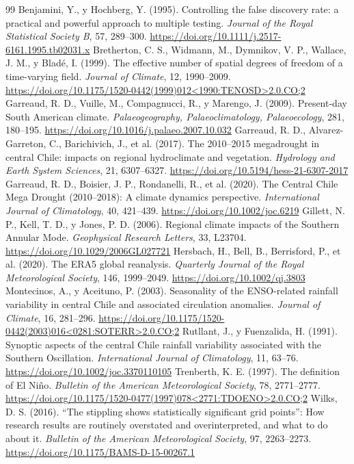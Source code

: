 \documentclass[11pt,letterpaper]{article}
\begin{document}
\begin{thebibliography}{99}\small
 Benjamini, Y., y Hochberg, Y. (1995). Controlling the false discovery rate: a practical and powerful approach to multiple testing. \emph{Journal of the Royal Statistical Society B}, 57, 289--300. \url{https://doi.org/10.1111/j.2517-6161.1995.tb02031.x}
 Bretherton, C. S., Widmann, M., Dymnikov, V. P., Wallace, J. M., y Bladé, I. (1999). The effective number of spatial degrees of freedom of a time-varying field. \emph{Journal of Climate}, 12, 1990--2009. \url{https://doi.org/10.1175/1520-0442(1999)012<1990:TENOSD>2.0.CO;2}
 Garreaud, R. D., Vuille, M., Compagnucci, R., y Marengo, J. (2009). Present-day South American climate. \emph{Palaeogeography, Palaeoclimatology, Palaeoecology}, 281, 180--195. \url{https://doi.org/10.1016/j.palaeo.2007.10.032}
 Garreaud, R. D., Alvarez-Garreton, C., Barichivich, J., et al. (2017). The 2010--2015 megadrought in central Chile: impacts on regional hydroclimate and vegetation. \emph{Hydrology and Earth System Sciences}, 21, 6307--6327. \url{https://doi.org/10.5194/hess-21-6307-2017}
 Garreaud, R. D., Boisier, J. P., Rondanelli, R., et al. (2020). The Central Chile Mega Drought (2010--2018): A climate dynamics perspective. \emph{International Journal of Climatology}, 40, 421--439. \url{https://doi.org/10.1002/joc.6219}
 Gillett, N. P., Kell, T. D., y Jones, P. D. (2006). Regional climate impacts of the Southern Annular Mode. \emph{Geophysical Research Letters}, 33, L23704. \url{https://doi.org/10.1029/2006GL027721}
 Hersbach, H., Bell, B., Berrisford, P., et al. (2020). The ERA5 global reanalysis. \emph{Quarterly Journal of the Royal Meteorological Society}, 146, 1999--2049. \url{https://doi.org/10.1002/qj.3803}
 Montecinos, A., y Aceituno, P. (2003). Seasonality of the ENSO-related rainfall variability in central Chile and associated circulation anomalies. \emph{Journal of Climate}, 16, 281--296. \url{https://doi.org/10.1175/1520-0442(2003)016<0281:SOTERR>2.0.CO;2}
 Rutllant, J., y Fuenzalida, H. (1991). Synoptic aspects of the central Chile rainfall variability associated with the Southern Oscillation. \emph{International Journal of Climatology}, 11, 63--76. \url{https://doi.org/10.1002/joc.3370110105}
 Trenberth, K. E. (1997). The definition of El Niño. \emph{Bulletin of the American Meteorological Society}, 78, 2771--2777. \url{https://doi.org/10.1175/1520-0477(1997)078<2771:TDOENO>2.0.CO;2}
 Wilks, D. S. (2016). ``The stippling shows statistically significant grid points'': How research results are routinely overstated and overinterpreted, and what to do about it. \emph{Bulletin of the American Meteorological Society}, 97, 2263--2273. \url{https://doi.org/10.1175/BAMS-D-15-00267.1}
\end{thebibliography}
\end{document}
